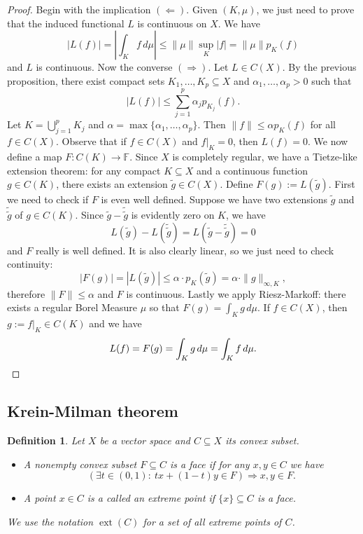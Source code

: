 \documentclass[10pt, a4paper]{article}
\newtheorem{defi}[thm]{Definition}
\newenvironment{noticeB}{%
  \tcolorbox[%
  notitle,
  empty,
  enhanced,  %
  breakable,
  coltext=black,
  colback=white, 
  fontupper=\rmfamily,
  noparskip,
  sharp corners,
  boxrule=-1pt,  %
  frame hidden,
  left=7pt,  %
  right=7pt,
  top=5pt,
  bottom=5pt,
  before skip=2.5ex plus 2pt,
  after skip=2.5ex plus 2pt,
  borderline west = {1.5pt}{-0.1pt}{blue!30!black}, %
  overlay unbroken and last={%
    \draw[color=black, line width=1.25pt]
    ($(frame.south west)+(1.pt, -0.1pt)$) -- ++(2em, 0);
  }
  ]}
{\endtcolorbox}
\newenvironment{definition}{\begin{noticeB}\begin{defi}}{%
    \end{defi}\end{noticeB}}
\newenvironment{noticeC}{%
  \tcolorbox[%
  notitle,
  empty,
  enhanced,  %
  breakable,
  coltext=black, 
  fontupper=\rmfamily,
  noparskip,
  sharp corners,
  boxrule=-1pt,  %
  frame hidden,
  left=7pt,  %
  right=7pt,
  top=5pt,
  bottom=5pt,
  before skip=2.5ex plus 2pt,
  after skip=2.5ex plus 2pt,
  overlay unbroken and last={%
  },
  ]}
{\endtcolorbox}
\newenvironment{myproof}%
  {\begin{noticeC}\begin{proof}}%
  {\end{proof}\end{noticeC}}
\newcommand{\F}{\mathbb {F}}
\DeclareMathOperator{\ext}{ext}
\begin{document}
\begin{myproof}
  Begin with the implication $(\Leftarrow)$. Given $(K, \mu)$, we just need to prove that the induced 
  functional $L$ is continuous on $X$. We have 
  $$|L(f)| = \left| \int_K f\, d\mu \right| \leq \|\mu\| \sup_K |f| = \|\mu\| p_K (f)$$
  and $L$ is continuous. Now the converse $(\Rightarrow)$.
  Let $L \in C(X)$. By the previous proposition, there exist compact sets 
  $K_1, \dots, K_p \subseteq X$ and $\alpha_1, \dots, \alpha_p > 0$ such that 
  $$|L(f)| \leq \sum_{j = 1} ^p \alpha_j p_{K_j} (f).$$
  Let $K = \bigcup_{j = 1} ^p K_j$ and $\alpha = \max \{\alpha_1, \dots, \alpha_p\}$.
  Then $\|f\| \leq \alpha p_K (f)$ for all $f \in C(X)$.
  Observe that if $f \in C(X)$ and $f \big|_K = 0$, then $L(f) = 0$.
  We now define a map $F: C(K) \to \F$. 
  Since $X$ is completely regular, we have a Tietze-like extension theorem: for any compact $K \subseteq X$ and a continuous function $g \in C(K)$,
  there exists an extension $\widetilde{g} \in C(X)$.
  Define $F(g) := L(\widetilde{g})$.
  First we need to check if $F$ is even well defined. Suppose we have two extensions $\widetilde{g}$ and $\widetilde{\widetilde{g}}$
  of $g \in C(K)$. Since $\widetilde{g} - \widetilde{\widetilde{g}}$ is evidently zero on $K$, we have 
  $$L(\widetilde{g}) - L(\widetilde{\widetilde{g}}) = L(\widetilde{g} - \widetilde{\widetilde{g}}) = 0$$
  and $F$ really is well defined. It is also clearly linear, so we just need to check continuity:
  $$|F(g)| = |L(\widetilde{g})| \leq \alpha \cdot p_K (\widetilde{g}) = \alpha \cdot \|g\|_{\infty, K},$$
  therefore $\|F\| \leq \alpha$ and $F$ is continuous. Lastly we apply Riesz-Markoff: there exists a regular Borel Measure $\mu$
  so that $F(g) = \int_K g\, d\mu.$ If $f \in C(X)$, then $g := f\big|_K \in C(K)$
  and we have 
  \begin{equation*}
    L(f) = F(g) = \int_K g\, d\mu = \int_K f \, d\mu. \qedhere
  \end{equation*}
\end{myproof}

\subsection{Krein-Milman theorem}

\begin{definition}
  Let $X$ be a vector space and $C \subseteq X$ its convex subset.
  \begin{itemize}
    \item[(a)] A nonempty convex subset $F \subseteq C$ is a face if for any $x, y \in C$ we have
    $$(\exists t \in (0, 1):\ tx + (1 - t)y \in F) \Rightarrow x, y \in F.$$
    \item[(b)] A point $x \in C$ is a called an extreme point if $\{x\} \subseteq C$ is a face.  
  \end{itemize}
  We use the notation $\ext (C)$ for a set of all extreme points of $C$.
\end{definition}
\end{document}
